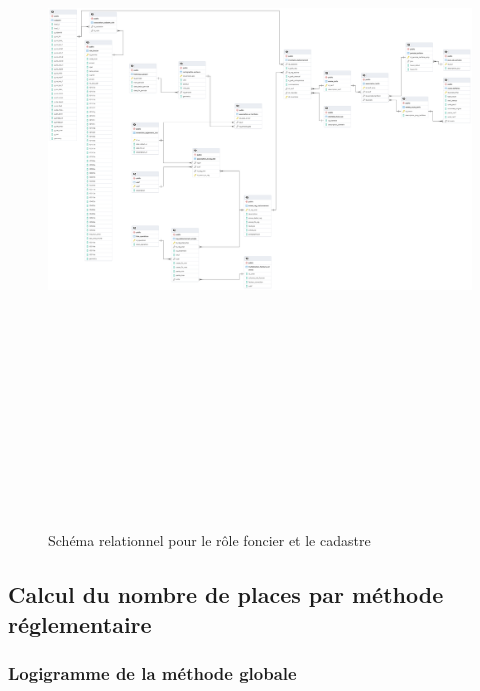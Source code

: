     \begin{figure}[ht!]
        \centering
        \includegraphics[trim={0cm 6cm 77.5cm 0cm},clip,height=20cm]{images/structure_base_de_donnee.png}
        \caption{Schéma relationnel pour le rôle foncier et le cadastre}
        \label{fig:offstreet_db_erd_input_data}
    \end{figure}
    \FloatBarrier
    
    \subsection{Calcul du nombre de places par méthode réglementaire}
        \subsubsection{Logigramme de la méthode globale}
